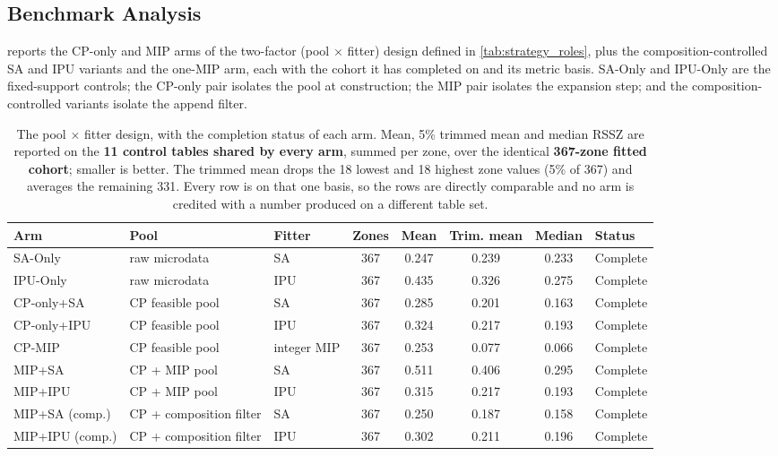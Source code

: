 \documentclass[review]{elsarticle}
\begin{document}
\subsection{Benchmark Analysis}
\label{sec:benchmark}
 reports the CP-only and MIP arms of the two-factor (pool $\times$ fitter) design defined in \cref{tab:strategy_roles}, plus the composition-controlled SA and IPU variants and the one-MIP arm, each with the cohort it has completed on and its metric basis. SA-Only and IPU-Only are the fixed-support controls; the CP-only pair isolates the pool at construction; the MIP pair isolates the expansion step; and the composition-controlled variants isolate the append filter.

\begin{table}[h!]
\centering
\caption{The pool $\times$ fitter design, with the completion status of each arm. Mean, 5\% trimmed mean and median RSSZ are reported on the \textbf{11 control tables shared by every arm}, summed per zone, over the identical \textbf{367-zone fitted cohort}; smaller is better. The trimmed mean drops the 18 lowest and 18 highest zone values (5\% of 367) and averages the remaining 331. Every row is on that one basis, so the rows are directly comparable and no arm is credited with a number produced on a different table set.}
\label{tab:pool_fitter_matrix}
\footnotesize
\setlength{\tabcolsep}{3.5pt}
\begin{tabular}{@{}lllcccc l@{}}
\toprule
\textbf{Arm} & \textbf{Pool} & \textbf{Fitter} & \textbf{Zones} & \textbf{Mean} & \textbf{Trim. mean} & \textbf{Median} & \textbf{Status} \\
\midrule
SA-Only      & raw microdata & SA  & 367 & 0.247 & 0.239 & 0.233 & Complete \\
IPU-Only     & raw microdata & IPU & 367 & 0.435 & 0.326 & 0.275 & Complete \\
CP-only+SA   & CP feasible pool & SA  & 367 & 0.285 & 0.201 & 0.163 & Complete \\
CP-only+IPU  & CP feasible pool & IPU & 367 & 0.324 & 0.217 & 0.193 & Complete \\
CP-MIP       & CP feasible pool & integer MIP & 367 & 0.253 & 0.077 & 0.066 & Complete \\
MIP+SA       & CP + MIP pool & SA  & 367 & 0.511 & 0.406 & 0.295 & Complete \\
MIP+IPU      & CP + MIP pool & IPU & 367 & 0.315 & 0.217 & 0.193 & Complete \\
MIP+SA (comp.) & CP + composition filter & SA & 367 & 0.250 & 0.187 & 0.158 & Complete \\
MIP+IPU (comp.) & CP + composition filter & IPU & 367 & 0.302 & 0.211 & 0.196 & Complete \\
\bottomrule
\end{tabular}
\end{table}
\end{document}
